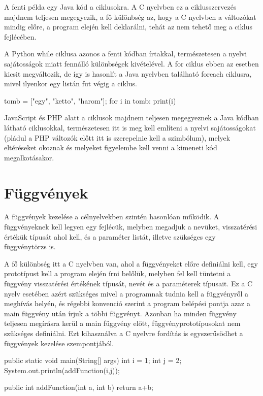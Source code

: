 A fenti példa egy Java kód a ciklusokra. A C nyelvben ez a ciklusszervezés majdnem teljesen megegyezik, a fő különbség az, hogy a C nyelvben a változókat mindig előre, a program elején kell deklarálni, tehát az nem tehető meg a ciklus fejlécében.

A Python while ciklusa azonos a fenti kódban írtakkal, természetesen a nyelvi sajátosságok miatt fennálló különbségek kivételével. A for ciklus ebben az esetben kicsit megváltozik, de így is hasonlít a Java nyelvben található foreach ciklusra, mivel ilyenkor egy listán fut végig a ciklus.

\begin{cpp}
	tomb = ["egy", "ketto", "harom"];
	for i in tomb:
		print(i)
\end{cpp}

JavaScript és PHP alatt a ciklusok majdnem teljesen megegyeznek a Java kódban látható ciklusokkal, természetesen itt is meg kell említeni a nyelvi sajátosságokat (pládul a PHP változók előtt itt is szerepelnie kell a \textdollar szimbólum), melyek eltéréseket okoznak és melyeket figyelembe kell venni a kimeneti kód megalkotásakor.

\section{Függvények}

A függvények kezelése a célnyelvekben szintén hasonlóan működik. A függvényeknek kell legyen egy fejlécük, melyben megadjuk a nevüket, visszatérési értékük típusát ahol kell, és a paraméter listát, illetve szükséges egy függvénytörzs is.

A fő különbség itt a C nyelvben van, ahol a függvényeket előre definiálni kell, egy prototípust kell a program elején írni belőlük, melyben fel kell tüntetni a függvény visszatérési értékének típusát, nevét és a paraméterek típusait. Ez a C nyelv esetében azért szükséges mivel a programnak tudnia kell a függvényről a meghívás helyén, és régebbi konvenció szerint a program belépési pontja azaz a main függvény után írjuk a többi függvényt. Azonban ha minden függvény teljesen megírásra kerül a main függvény előtt, függvényprototípusokat nem szükséges definiálni. Ezt kihasználva a C nyelvre fordítás is egyszerűsödhet a függvények kezelése szempontjából.

\begin{cpp}
	public static void main(String[] args) {
		int i = 1;
		int j = 2;
		System.out.println(addFunction(i,j));
	}
	
	public int addFunction(int a, int b) {
		return a+b;
	}
\end{cpp}

